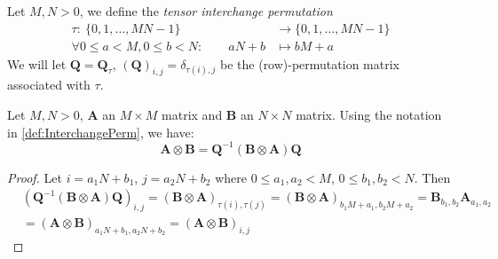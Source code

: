 \begin{definition} \label{def:InterchangePerm}
    Let \(M, N > 0\), we define the \emph{tensor interchange permutation}
    \begin{align*}
        \tau:\: \{0, 1, \ldots, MN-1\} &\to \{0, 1, \ldots, MN- 1\} \\
        \forall 0 \le a < M, 0 \le b < N:\qquad aN + b &\mapsto bM + a
    \end{align*}
    We will let \(\bm{Q} = \bm{Q}_{\tau}\), \(\left(\bm{Q}\right)_{i,j} = \delta_{\tau(i), j}\) be the (row)-permutation matrix associated with \(\tau\).
\end{definition}

\begin{proposition} \label{prop:TensorInterchange}
    Let \(M, N > 0\), \(\bm{A}\) an \(M \times M\) matrix and \(\bm{B}\) an \(N \times N\) matrix. Using the notation in \cref{def:InterchangePerm}, we have:
    \[\bm{A} \otimes \bm{B} = \bm{Q}^{-1} \left(\bm{B} \otimes \bm{A}\right) \bm{Q}\]
\end{proposition}
\begin{proof}
    Let \(i = a_1 N + b_1\), \(j = a_2 N + b_2\) where \(0 \le a_1, a_2 < M\), \(0 \le b_1, b_2 < N\). Then
    \begin{align*}
        &\left(\bm{Q}^{-1} \left(\bm{B} \otimes \bm{A}\right) \bm{Q}\right)_{i,j} = \left(\bm{B} \otimes \bm{A}\right)_{\tau(i), \tau(j)} = \left(\bm{B} \otimes \bm{A}\right)_{b_1 M + a_1, b_2 M + a_2} = \bm{B}_{b_1, b_2} \bm{A}_{a_1, a_2} \\
        &= \left(\bm{A} \otimes \bm{B}\right)_{a_1 N + b_1, a_2 N + b_2} = \left(\bm{A} \otimes \bm{B}\right)_{i,j}
    \end{align*}
\end{proof}

